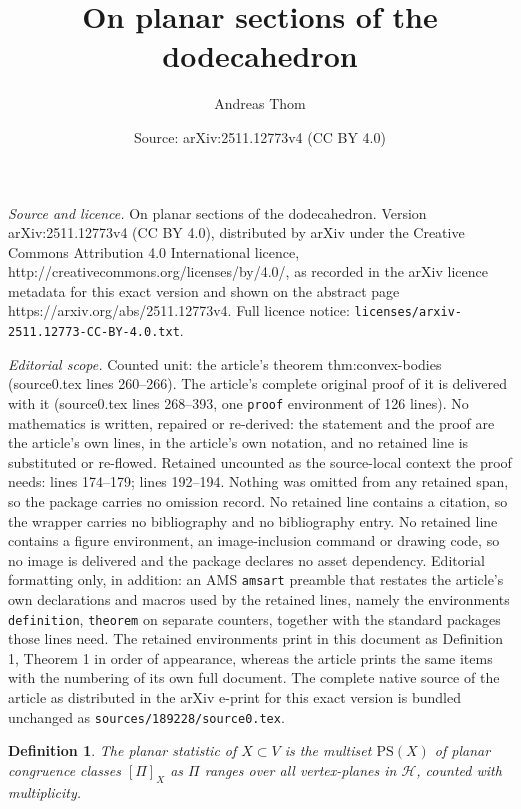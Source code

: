 \documentclass[10pt,a4paper]{amsart}
\title{On planar sections of the dodecahedron}
\author{Andreas Thom}
\date{Source: arXiv:2511.12773v4 (CC BY 4.0)}
\newtheorem{definition}{Definition}
\begin{document}
\maketitle

\noindent\emph{Source and licence.} On planar sections of the dodecahedron. Version arXiv:2511.12773v4 (CC BY 4.0), distributed by arXiv under the Creative Commons Attribution 4.0 International licence, http://creativecommons.org/licenses/by/4.0/, as recorded in the arXiv licence metadata for this exact version and shown on the abstract page https://arxiv.org/abs/2511.12773v4. Full licence notice: \texttt{licenses/arxiv-2511.12773-CC-BY-4.0.txt}.\par\smallskip

\noindent\textit{Editorial scope.} Counted unit: the article's theorem thm:convex-bodies (source0.tex lines 260--266). The article's complete original proof of it is delivered with it (source0.tex lines 268--393, one \texttt{proof} environment of 126 lines). No mathematics is written, repaired or re-derived: the statement and the proof are the article's own lines, in the article's own notation, and no retained line is substituted or re-flowed.  Retained uncounted as the source-local context the proof needs: lines 174--179; lines 192--194.  Nothing was omitted from any retained span, so the package carries no omission record.  No retained line contains a citation, so the wrapper carries no bibliography and no bibliography entry.  No retained line contains a figure environment, an image-inclusion command or drawing code, so no image is delivered and the package declares no asset dependency.  Editorial formatting only, in addition: an AMS \texttt{amsart} preamble that restates the article's own declarations and macros used by the retained lines, namely the environments \texttt{definition}, \texttt{theorem} on separate counters, together with the standard packages those lines need.  The retained environments print in this document as Definition 1, Theorem 1 in order of appearance, whereas the article prints the same items with the numbering of its own full document.  The complete native source of the article as distributed in the arXiv e-print for this exact version is bundled unchanged as \texttt{sources/189228/source0.tex}.
\begin{definition}\label{def:planar-statistics}
The \emph{planar statistic} of $X\subset V$ is the
multiset $\mathrm{PS}(X)$
of planar congruence classes $[\Pi]_X$ as $\Pi$ ranges over all vertex-planes
in $\mathcal{H}$, counted with multiplicity. 
\end{definition}
\end{document}
